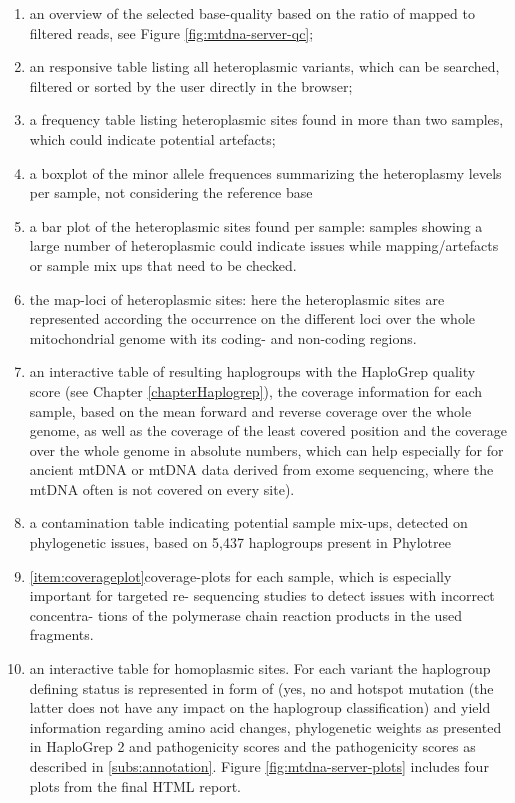\begin{enumerate}[label=\textbf{QC.\arabic*}]
\item an overview of the selected base-quality based on the ratio of mapped to filtered reads, see Figure \ref{fig:mtdna-server-qc}; 
\item an responsive table listing all heteroplasmic variants, which can be searched, filtered or sorted by the user directly in the browser; 
\item a frequency table listing heteroplasmic sites found in more than two samples, which could indicate potential artefacts; 
\item \label{item:boxplot} a boxplot of the minor allele frequences summarizing the heteroplasmy levels per sample, not considering the reference base
\item \label{item:barplot}a bar plot of the heteroplasmic sites found per sample: samples showing a large number of heteroplasmic could indicate issues while mapping/artefacts or sample mix ups that need to be checked.  
\item \label{item:maplocus}the map-loci of heteroplasmic sites: here the heteroplasmic sites are represented according the occurrence on the different loci over the whole mitochondrial genome with its coding- and non-coding regions.
\item an interactive table of resulting haplogroups with the HaploGrep quality score (see Chapter \ref{chapterHaplogrep}), the coverage information for each sample, based on the mean forward and reverse coverage over the whole genome, as well as the coverage of the least covered position and the coverage over the whole genome in absolute numbers, which can help especially for for ancient mtDNA or mtDNA data derived from exome sequencing, where the mtDNA often is not covered on every site). 
\item  a contamination table indicating potential sample mix-ups, detected on phylogenetic issues, based on 5,437 haplogroups present in Phylotree 
\item  \ref{item:coverageplot}coverage-plots for each sample, which is especially important for targeted re- sequencing studies to detect issues with incorrect concentra- tions of the polymerase chain reaction products in the used fragments. 
\item  an interactive table for homoplasmic sites. For each variant the haplogroup defining status is represented in form of (yes, no and hotspot mutation (the latter does not have any impact on the haplogroup classification) and yield information regarding amino acid changes, phylogenetic weights as presented in HaploGrep 2 and pathogenicity scores and the pathogenicity scores as described in \ref{subs:annotation}. Figure \ref{fig:mtdna-server-plots} includes four plots from the final HTML report.
\end{enumerate}
